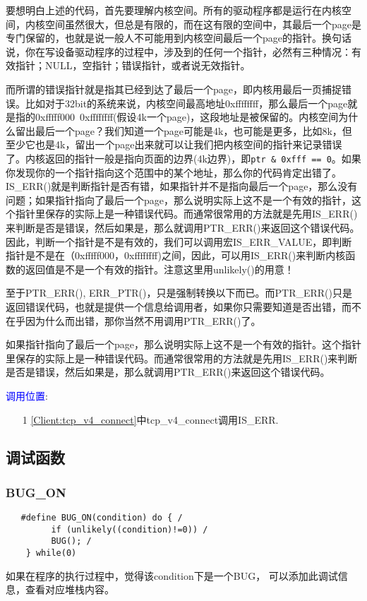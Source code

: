 				要想明白上述的代码，首先要理解内核空间。所有的驱动程序都是运行在内核空间，内核空间虽然很大，但总是有限的，而在这有限的空间中，其最后一个page是专门保留的，也就是说一般人不可能用到内核空间最后一个page的指针。换句话说，你在写设备驱动程序的过程中，涉及到的任何一个指针，必然有三种情况：有效指针；NULL，空指针；错误指针，或者说无效指针。

				而所谓的错误指针就是指其已经到达了最后一个page，即内核用最后一页捕捉错误。比如对于32bit的系统来说，内核空间最高地址0xffffffff，那么最后一个page就是指的0xfffff000~0xffffffff(假设4k一个page)，这段地址是被保留的。内核空间为什么留出最后一个page？我们知道一个page可能是4k，也可能是更多，比如8k，但至少它也是4k，留出一个page出来就可以让我们把内核空间的指针来记录错误了。内核返回的指针一般是指向页面的边界(4k边界)，即\texttt{ptr & 0xfff == 0}。如果你发现你的一个指针指向这个范围中的某个地址，那么你的代码肯定出错了。IS\_ERR()就是判断指针是否有错，如果指针并不是指向最后一个page，那么没有问题；如果指针指向了最后一个page，那么说明实际上这不是一个有效的指针，这个指针里保存的实际上是一种错误代码。而通常很常用的方法就是先用IS\_ERR()来判断是否是错误，然后如果是，那么就调用PTR\_ERR()来返回这个错误代码。因此，判断一个指针是不是有效的，我们可以调用宏IS\_ERR\_VALUE，即判断指针是不是在（0xfffff000，0xffffffff)之间，因此，可以用IS\_ERR()来判断内核函数的返回值是不是一个有效的指针。注意这里用unlikely()的用意！

				至于PTR\_ERR(), ERR\_PTR()，只是强制转换以下而已。而PTR\_ERR()只是返回错误代码，也就是提供一个信息给调用者，如果你只需要知道是否出错，而不在乎因为什么而出错，那你当然不用调用PTR\_ERR()了。

				如果指针指向了最后一个page，那么说明实际上这不是一个有效的指针。这个指针里保存的实际上是一种错误代码。而通常很常用的方法就是先用IS\_ERR()来判断是否是错误，然后如果是，那么就调用PTR\_ERR()来返回这个错误代码。

				\textcolor{blue}{调用位置}:

\begin{enumerate}
\item[1]		\ref{Client:tcp_v4_connect}中tcp\_v4\_connect调用IS\_ERR.
\end{enumerate}
		\subsection{调试函数}
			\subsubsection{BUG\_ON}
\begin{verbatim}
   #define BUG_ON(condition) do { /
         if (unlikely((condition)!=0)) /
         BUG(); /
    } while(0)
\end{verbatim}
    			如果在程序的执行过程中，觉得该condition下是一个BUG，
				可以添加此调试信息，查看对应堆栈内容。

